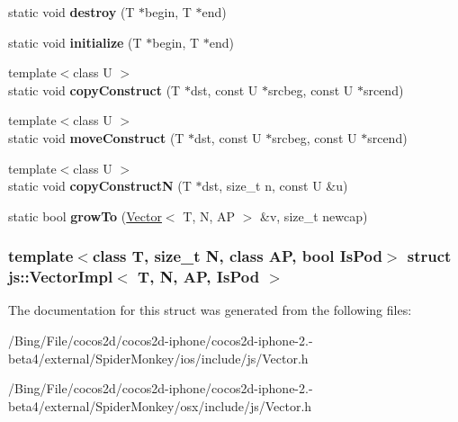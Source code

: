 \begin{DoxyCompactItemize}
\item 
\hypertarget{structjs_1_1_vector_impl_a4ad64527221a61f397f314e98bd8b22c}{static void {\bfseries destroy} (T $\ast$begin, T $\ast$end)}\label{structjs_1_1_vector_impl_a4ad64527221a61f397f314e98bd8b22c}

\item 
\hypertarget{structjs_1_1_vector_impl_a3a23138b1af1cf2954138b2e25078300}{static void {\bfseries initialize} (T $\ast$begin, T $\ast$end)}\label{structjs_1_1_vector_impl_a3a23138b1af1cf2954138b2e25078300}

\item 
\hypertarget{structjs_1_1_vector_impl_adff79952e30c7740b46f75cc6a9b17ed}{{\footnotesize template$<$class U $>$ }\\static void {\bfseries copy\-Construct} (T $\ast$dst, const U $\ast$srcbeg, const U $\ast$srcend)}\label{structjs_1_1_vector_impl_adff79952e30c7740b46f75cc6a9b17ed}

\item 
\hypertarget{structjs_1_1_vector_impl_a0451c419d0c647f7f7f301ed013b83fb}{{\footnotesize template$<$class U $>$ }\\static void {\bfseries move\-Construct} (T $\ast$dst, const U $\ast$srcbeg, const U $\ast$srcend)}\label{structjs_1_1_vector_impl_a0451c419d0c647f7f7f301ed013b83fb}

\item 
\hypertarget{structjs_1_1_vector_impl_a3db161659cdc7fcbe328586493ec552a}{{\footnotesize template$<$class U $>$ }\\static void {\bfseries copy\-Construct\-N} (T $\ast$dst, size\-\_\-t n, const U \&u)}\label{structjs_1_1_vector_impl_a3db161659cdc7fcbe328586493ec552a}

\item 
\hypertarget{structjs_1_1_vector_impl_ae26fcd214742649f8f330b314b38f544}{static bool {\bfseries grow\-To} (\hyperlink{classjs_1_1_vector}{Vector}$<$ T, N, A\-P $>$ \&v, size\-\_\-t newcap)}\label{structjs_1_1_vector_impl_ae26fcd214742649f8f330b314b38f544}

\end{DoxyCompactItemize}
\subsubsection*{template$<$class T, size\-\_\-t N, class A\-P, bool Is\-Pod$>$ struct js\-::\-Vector\-Impl$<$ T, N, A\-P, Is\-Pod $>$}



The documentation for this struct was generated from the following files\-:\begin{DoxyCompactItemize}
\item 
/\-Bing/\-File/cocos2d/cocos2d-\/iphone/cocos2d-\/iphone-\/2.-\/beta4/external/\-Spider\-Monkey/ios/include/js/Vector.\-h\item 
/\-Bing/\-File/cocos2d/cocos2d-\/iphone/cocos2d-\/iphone-\/2.-\/beta4/external/\-Spider\-Monkey/osx/include/js/Vector.\-h\end{DoxyCompactItemize}
